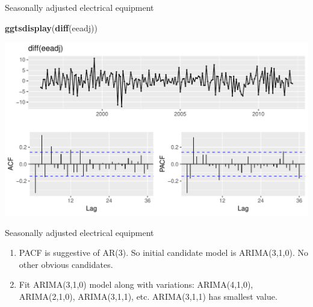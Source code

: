 \documentclass[14pt,ignorenonframetext,]{beamer}
\newenvironment{Shaded}{\begin{snugshade}}{\end{snugshade}}
\newcommand{\KeywordTok}[1]{\textcolor[rgb]{0.13,0.29,0.53}{\textbf{#1}}}
\newcommand{\NormalTok}[1]{#1}
\providecommand{\tightlist}{%
  \setlength{\itemsep}{0pt}\setlength{\parskip}{0pt}}
\begin{document}
\begin{frame}[fragile]{\large Seasonally adjusted electrical equipment}

\begin{Shaded}
\begin{Highlighting}[]
\KeywordTok{ggtsdisplay}\NormalTok{(}\KeywordTok{diff}\NormalTok{(eeadj))}
\end{Highlighting}
\end{Shaded}

\includegraphics{week_5_arima_files/figure-beamer/ee2-1.pdf}

\end{frame}

\begin{frame}{\large Seasonally adjusted electrical equipment}

\begin{enumerate}
\def\labelenumi{\arabic{enumi}.}
\setcounter{enumi}{3}
\tightlist
\item
  PACF is suggestive of AR(3). So initial candidate model is
  ARIMA(3,1,0). No other obvious candidates.
\item
  Fit ARIMA(3,1,0) model along with variations: ARIMA(4,1,0),
  ARIMA(2,1,0), ARIMA(3,1,1), etc. ARIMA(3,1,1) has smallest 
  value.
\end{enumerate}

\end{frame}
\end{document}
